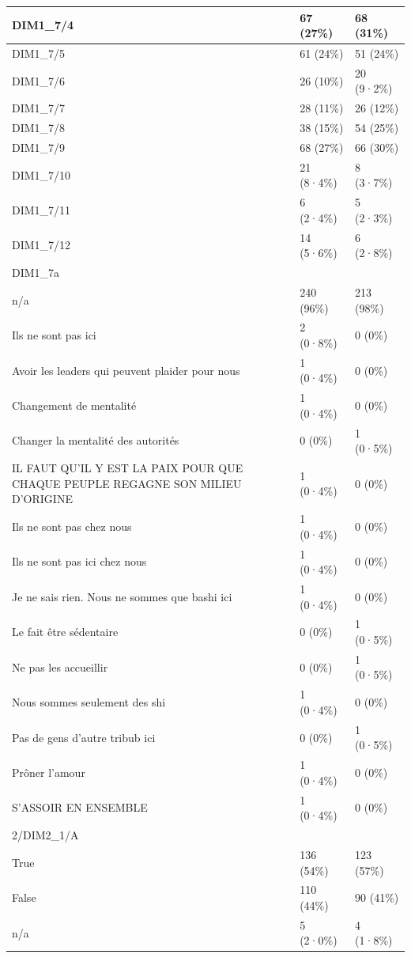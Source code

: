\documentclass[
]{book}
\begin{document}
\begin{tabular}{l|l|l}
\hline
DIM1\_7/4 & 67 (27\%) & 68 (31\%)\\
\hline
DIM1\_7/5 & 61 (24\%) & 51 (24\%)\\
\hline
DIM1\_7/6 & 26 (10\%) & 20 (9·2\%)\\
\hline
DIM1\_7/7 & 28 (11\%) & 26 (12\%)\\
\hline
DIM1\_7/8 & 38 (15\%) & 54 (25\%)\\
\hline
DIM1\_7/9 & 68 (27\%) & 66 (30\%)\\
\hline
DIM1\_7/10 & 21 (8·4\%) & 8 (3·7\%)\\
\hline
DIM1\_7/11 & 6 (2·4\%) & 5 (2·3\%)\\
\hline
DIM1\_7/12 & 14 (5·6\%) & 6 (2·8\%)\\
\hline
DIM1\_7a &  & \\
\hline
n/a & 240 (96\%) & 213 (98\%)\\
\hline
Ils ne sont pas ici & 2 (0·8\%) & 0 (0\%)\\
\hline
Avoir les leaders qui peuvent plaider pour nous & 1 (0·4\%) & 0 (0\%)\\
\hline
Changement de mentalité & 1 (0·4\%) & 0 (0\%)\\
\hline
Changer la mentalité des autorités & 0 (0\%) & 1 (0·5\%)\\
\hline
IL FAUT QU'IL Y EST LA PAIX POUR QUE CHAQUE PEUPLE REGAGNE SON MILIEU D'ORIGINE & 1 (0·4\%) & 0 (0\%)\\
\hline
Ils ne sont pas chez nous & 1 (0·4\%) & 0 (0\%)\\
\hline
Ils ne sont pas ici chez nous & 1 (0·4\%) & 0 (0\%)\\
\hline
Je ne sais rien. Nous ne sommes que bashi ici & 1 (0·4\%) & 0 (0\%)\\
\hline
Le fait être sédentaire & 0 (0\%) & 1 (0·5\%)\\
\hline
Ne pas les accueillir & 0 (0\%) & 1 (0·5\%)\\
\hline
Nous sommes seulement des shi & 1 (0·4\%) & 0 (0\%)\\
\hline
Pas de gens d'autre tribub ici & 0 (0\%) & 1 (0·5\%)\\
\hline
Prôner l'amour & 1 (0·4\%) & 0 (0\%)\\
\hline
S'ASSOIR EN ENSEMBLE & 1 (0·4\%) & 0 (0\%)\\
\hline
2/DIM2\_1/A &  & \\
\hline
True & 136 (54\%) & 123 (57\%)\\
\hline
False & 110 (44\%) & 90 (41\%)\\
\hline
n/a & 5 (2·0\%) & 4 (1·8\%)\\

\end{tabular}
\end{document}
